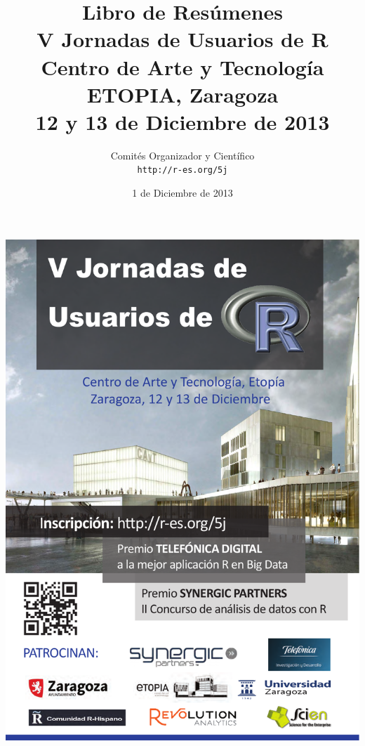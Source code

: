 \documentclass[a4paper, 12pt]{memoir}
\begin{document}
\frontmatter

\begin{titlingpage}

  \title{
    \Large{Libro de Resúmenes}\\
    \Huge{V Jornadas de Usuarios de R}\\
    \vspace{15pt}
    \Large{Centro de Arte y Tecnología ETOPIA, Zaragoza}\\
    \large{12 y 13 de Diciembre de 2013}\\
  }

  \author{
    Comités Organizador y Científico\\
    \texttt{http://r-es.org/5j}}

  \date{1 de Diciembre de 2013}

  \maketitle


\end{titlingpage}

\includegraphics[width=\textwidth]{Logos/cartel.pdf}
\end{document}
